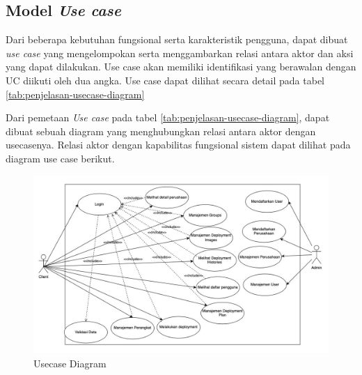 \subsection{Model \textit{Use case}}
\label{subsec:model-usecase}
Dari beberapa kebutuhan fungsional serta karakteristik pengguna, dapat dibuat \textit{use case} yang mengelompokan serta menggambarkan relasi antara aktor dan aksi yang dapat dilakukan. Use case akan memiliki identifikasi yang berawalan dengan UC diikuti oleh dua angka. Use case dapat dilihat secara detail pada tabel \ref{tab:penjelasan-usecase-diagram}

Dari pemetaan \textit{Use case} pada tabel \ref{tab:penjelasan-usecase-diagram}, dapat dibuat sebuah diagram yang menghubungkan relasi antara aktor dengan usecasenya. Relasi  aktor dengan kapabilitas fungsional sistem dapat dilihat pada diagram use case berikut.

\begin{figure}[h]
  \centering
  \includegraphics[width=1\textwidth]{resources/chapter-3/usecase-diagram.jpg}
  \caption{Usecase Diagram}
  \label{fig:usecase-diagram}
\end{figure}